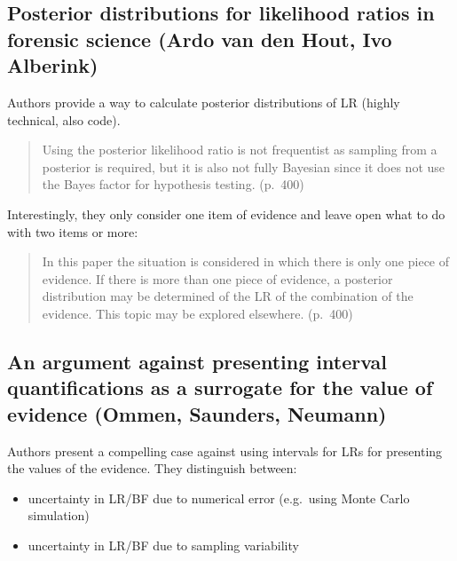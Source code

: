 \documentclass[
  10pt,
  dvipsnames,enabledeprecatedfontcommands]{scrartcl}
\begin{document}
\hypertarget{posterior-distributions-for-likelihood-ratios-in-forensic-science-ardo-van-den-hout-ivo-alberink}{%
\subsection{Posterior distributions for likelihood ratios in forensic
science (Ardo van den Hout, Ivo
Alberink)}\label{posterior-distributions-for-likelihood-ratios-in-forensic-science-ardo-van-den-hout-ivo-alberink}}

Authors provide a way to calculate posterior distributions of LR (highly
technical, also code).

\begin{quote}
Using the posterior likelihood ratio is not frequentist as sampling from
a posterior is required, but it is also not fully Bayesian since it does
not use the Bayes factor for hypothesis testing. (p.~400)
\end{quote}

\noindent Interestingly, they only consider one item of evidence and
leave open what to do with two items or more:

\begin{quote}
In this paper the situation is considered in which there is only one
piece of evidence. If there is more than one piece of evidence, a
posterior distribution may be determined of the LR of the combination of
the evidence. This topic may be explored elsewhere. (p.~400)
\end{quote}

\hypertarget{an-argument-against-presenting-interval-quantifications-as-a-surrogate-for-the-value-of-evidence-ommen-saunders-neumann}{%
\subsection{An argument against presenting interval quantifications as a
surrogate for the value of evidence (Ommen, Saunders,
Neumann)}\label{an-argument-against-presenting-interval-quantifications-as-a-surrogate-for-the-value-of-evidence-ommen-saunders-neumann}}

Authors present a compelling case against using intervals for LRs for
presenting the values of the evidence. They distinguish between:

\begin{itemize}
\item
  uncertainty in LR/BF due to numerical error (e.g.~using Monte Carlo
  simulation)
\item
  uncertainty in LR/BF due to sampling variability
\end{itemize}
\end{document}
